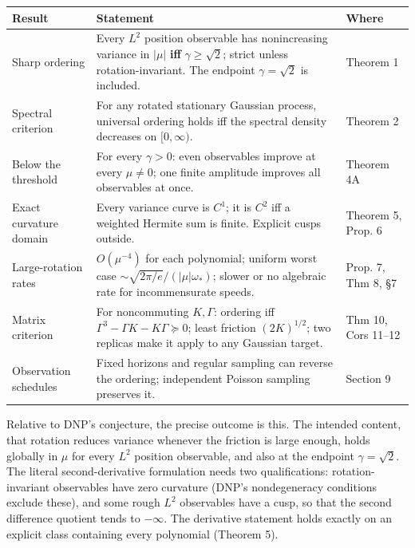 \documentclass[
  british,
  11pt,
  a4paper,
]{article}
\newcounter{none} %
\begin{document}
{\def\LTcaptype{none} %
\begin{longtable}[]{@{}
  >{\raggedright\arraybackslash}p{}
  >{\raggedright\arraybackslash}p{}
  >{\raggedright\arraybackslash}p{}@{}}
\toprule\noalign{}
\begin{minipage}[b]{\linewidth}\raggedright
Result
\end{minipage} & \begin{minipage}[b]{\linewidth}\raggedright
Statement
\end{minipage} & \begin{minipage}[b]{\linewidth}\raggedright
Where
\end{minipage} \\
\midrule\noalign{}
\endhead
\bottomrule\noalign{}
\endlastfoot
Sharp ordering & Every \(L^2\) position observable has nonincreasing
variance in \(\lvert\mu\rvert\) \textbf{iff} \(\gamma\ge\sqrt2\); strict
unless rotation-invariant. The endpoint \(\gamma=\sqrt2\) is included. &
Theorem 1 \\
Spectral criterion & For any rotated stationary Gaussian process,
universal ordering holds iff the spectral density decreases on
\([0,\infty)\). & Theorem 2 \\
Below the threshold & For every \(\gamma>0\): even observables improve
at every \(\mu\ne0\); one finite amplitude improves all observables at
once. & Theorem 4A \\
Exact curvature domain & Every variance curve is \(C^1\); it is \(C^2\)
iff a weighted Hermite sum is finite. Explicit cusps outside. & Theorem
5, Prop. 6 \\
Large-rotation rates & \(O(\mu^{-4})\) for each polynomial; uniform
worst case \(\sim\sqrt{2\pi/e}/(\lvert\mu\rvert\omega_*)\); slower or no
algebraic rate for incommensurate speeds. & Prop. 7, Thm 8, §7 \\
Matrix criterion & For noncommuting \(K,\Gamma\): ordering iff
\(\Gamma^3-\Gamma K-K\Gamma\succeq0\); least friction \((2K)^{1/2}\);
two replicas make it apply to any Gaussian target. & Thm 10, Cors
11--12 \\
Observation schedules & Fixed horizons and regular sampling can reverse
the ordering; independent Poisson sampling preserves it. & Section 9 \\
\end{longtable}
}

Relative to DNP's conjecture, the precise outcome is this. The intended
content, that rotation reduces variance whenever the friction is large
enough, holds globally in \(\mu\) for every \(L^2\) position observable,
and also at the endpoint \(\gamma=\sqrt2\). The literal
second-derivative formulation needs two qualifications:
rotation-invariant observables have zero curvature (DNP's nondegeneracy
conditions exclude these), and some rough \(L^2\) observables have a
cusp, so that the second difference quotient tends to \(-\infty\). The
derivative statement holds exactly on an explicit class containing every
polynomial (Theorem 5).
\end{document}
